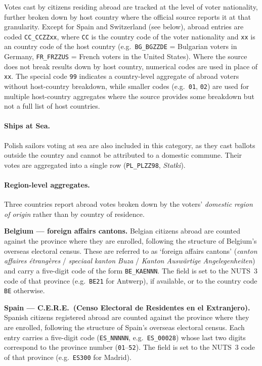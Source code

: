 Votes cast by citizens residing abroad are tracked at the level of voter
nationality, further broken down by host country where the official source
reports it at that granularity.
Except for Spain and Switzerland (see below), 
abroad entries are coded \texttt{CC\_CCZZxx}, where
\texttt{CC} is the country code of the voter nationality and \texttt{xx} is an
country code of the host country
(e.g.\ \texttt{BG\_BGZZDE} = Bulgarian voters in Germany,
\texttt{FR\_FRZZUS} = French voters in the United States).
Where the source does not break results down by host country, numerical
codes are used in place of \texttt{xx}. The special code \texttt{99}
indicates a country-level aggregate of abroad voters without host-country breakdown,
while smaller codes (e.g.\ \texttt{01}, \texttt{02}) are used for multiple host-country 
aggregates where the source provides some breakdown but not a full list of host countries.

\paragraph{Ships at Sea.} Polish sailors voting at sea are also included in this category, as they cast
ballots outside the country and cannot be attributed to a domestic commune.
Their votes are aggregated into a single row (\texttt{PL\_PLZZ98},
\textit{Statki}).

\paragraph{Region-level aggregates.}
Three countries report abroad votes broken down by the voters' \emph{domestic
region of origin} rather than by country of residence.

\textbf{Belgium --- foreign affairs cantons.}
Belgian citizens abroad are counted against the province where they are enrolled,
following the structure of Belgium's overseas electoral census.
These are referred to as `foreign affairs cantons' (\emph{canton affaires étrangères} /
\emph{speciaal kanton Buza} / \emph{Kanton Auswärtige Angelegenheiten})
and carry a five-digit code of the form \texttt{BE\_KAENNN}.
The  field is set to the NUTS~3 code of that province
(e.g.\ \texttt{BE21} for Antwerp), if available, or to the country code \texttt{BE} otherwise.

\textbf{Spain --- C.E.R.E.\ (Censo Electoral de Residentes en el Extranjero).}
Spanish citizens registered abroad are counted against the province where they
are enrolled, following the structure of Spain's overseas electoral census.
Each entry carries a five-digit code (\texttt{ES\_NNNNN}, e.g.\
\texttt{ES\_00028}) whose last two digits correspond to the province number
(\texttt{01}--\texttt{52}).
The  field is set to the NUTS~3 code of that province
(e.g.\ \texttt{ES300} for Madrid).

